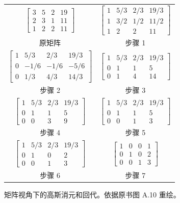 \begin{figure}[htbp]
  \centering
  \scriptsize
  \renewcommand{\arraystretch}{1.15}
  \begin{tabular}{c@{\ $\Longrightarrow$\ }c}
    $\left[\begin{array}{ccc|c}3&5&2&19\\2&3&1&11\\1&2&2&11\end{array}\right]$
      & $\left[\begin{array}{ccc|c}1&5/3&2/3&19/3\\1&3/2&1/2&11/2\\1&2&2&11\end{array}\right]$\\
    原矩阵 & 步骤 1\\[0.5em]
    $\left[\begin{array}{ccc|c}1&5/3&2/3&19/3\\0&-1/6&-1/6&-5/6\\0&1/3&4/3&14/3\end{array}\right]$
      & $\left[\begin{array}{ccc|c}1&5/3&2/3&19/3\\0&1&1&5\\0&1&4&14\end{array}\right]$\\
    步骤 2 & 步骤 3\\[0.5em]
    $\left[\begin{array}{ccc|c}1&5/3&2/3&19/3\\0&1&1&5\\0&0&3&9\end{array}\right]$
      & $\left[\begin{array}{ccc|c}1&5/3&2/3&19/3\\0&1&1&5\\0&0&1&3\end{array}\right]$\\
    步骤 4 & 步骤 5\\[0.5em]
    $\left[\begin{array}{ccc|c}1&5/3&2/3&19/3\\0&1&0&2\\0&0&1&3\end{array}\right]$
      & $\left[\begin{array}{ccc|c}1&0&0&1\\0&1&0&2\\0&0&1&3\end{array}\right]$\\
    步骤 6 & 步骤 7
  \end{tabular}
  \caption{矩阵视角下的高斯消元和回代。依据原书图 A.10 重绘。}
  \label{fig:a-10}
\end{figure}

